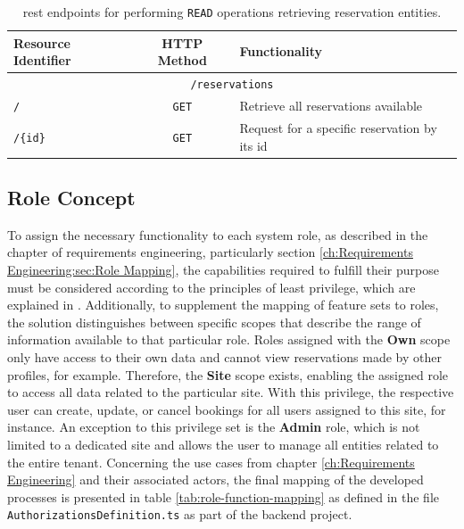 \begingroup
\setlength{\tabcolsep}{10pt} %
\renewcommand{\arraystretch}{1.5} %
\begin{table}[h]
\centering
\caption{\acrshort{rest} endpoints for performing \texttt{READ} operations retrieving reservation entities.}
    \begin{tabular}{l|c|m{5cm}}
    Resource Identifier & HTTP Method & Functionality \\ \hline
    \multicolumn{3}{c}{\texttt{/reservations}} \\ \hline
    \texttt{/} & \texttt{GET} & Retrieve all reservations available \\
    \texttt{/\{id\}} & \texttt{GET} & Request for a specific reservation by its \acrshort{id} \\
    \end{tabular}
\label{tab:read-reservations-rest}
\end{table}
\endgroup

\subsection{Role Concept}
\label{ch:Implementation:sec:Reservation System:ssec:Role Concept}

To assign the necessary functionality to each system role, as described in the chapter of requirements engineering, particularly  section \ref{ch:Requirements Engineering:sec:Role Mapping}, the capabilities required to fulfill their purpose must be considered according to the principles of least privilege, which are explained in \cite{ma_specifying_2011}.
Additionally, to supplement the mapping of feature sets to roles, the solution distinguishes between specific scopes that describe the range of information available to that particular role.
Roles assigned with the \textbf{Own} scope only have access to their own data and cannot view reservations made by other profiles, for example.
Therefore, the \textbf{Site} scope exists, enabling the assigned role to access all data related to the particular site.
With this privilege, the respective user can create, update, or cancel bookings for all users assigned to this site, for instance. An exception to this privilege set is the \textbf{Admin} role, which is not limited to a dedicated site and allows the user to manage all entities related to the entire tenant. 
Concerning the use cases from chapter \ref{ch:Requirements Engineering} and their associated actors, the final mapping of the developed processes is presented in table \ref{tab:role-function-mapping} as defined in the file \texttt{AuthorizationsDefinition.ts} as part of the backend project.

